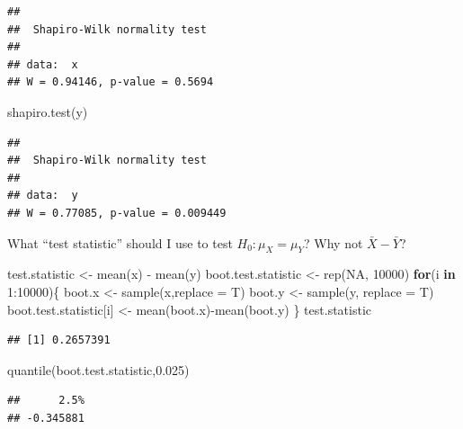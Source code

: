 \documentclass[
]{book}
\newenvironment{Shaded}{\begin{snugshade}}{\end{snugshade}}
\newcommand{\AttributeTok}[1]{\textcolor[rgb]{0.77,0.63,0.00}{#1}}
\newcommand{\ConstantTok}[1]{\textcolor[rgb]{0.00,0.00,0.00}{#1}}
\newcommand{\ControlFlowTok}[1]{\textcolor[rgb]{0.13,0.29,0.53}{\textbf{#1}}}
\newcommand{\DecValTok}[1]{\textcolor[rgb]{0.00,0.00,0.81}{#1}}
\newcommand{\FloatTok}[1]{\textcolor[rgb]{0.00,0.00,0.81}{#1}}
\newcommand{\FunctionTok}[1]{\textcolor[rgb]{0.00,0.00,0.00}{#1}}
\newcommand{\NormalTok}[1]{#1}
\newcommand{\OtherTok}[1]{\textcolor[rgb]{0.56,0.35,0.01}{#1}}
\newcommand{\SpecialCharTok}[1]{\textcolor[rgb]{0.00,0.00,0.00}{#1}}
\begin{document}
\begin{verbatim}
## 
##  Shapiro-Wilk normality test
## 
## data:  x
## W = 0.94146, p-value = 0.5694
\end{verbatim}

\begin{Shaded}
\begin{Highlighting}[]
\FunctionTok{shapiro.test}\NormalTok{(y)}
\end{Highlighting}
\end{Shaded}

\begin{verbatim}
## 
##  Shapiro-Wilk normality test
## 
## data:  y
## W = 0.77085, p-value = 0.009449
\end{verbatim}

What ``test statistic'' should I use to test \(H_0:\mu_X = \mu_Y\)? Why not \(\bar X - \bar Y\)?

\begin{Shaded}
\begin{Highlighting}[]
\NormalTok{test.statistic }\OtherTok{\textless{}{-}} \FunctionTok{mean}\NormalTok{(x) }\SpecialCharTok{{-}} \FunctionTok{mean}\NormalTok{(y)}
\NormalTok{boot.test.statistic }\OtherTok{\textless{}{-}} \FunctionTok{rep}\NormalTok{(}\ConstantTok{NA}\NormalTok{, }\DecValTok{10000}\NormalTok{)}
\ControlFlowTok{for}\NormalTok{(i }\ControlFlowTok{in} \DecValTok{1}\SpecialCharTok{:}\DecValTok{10000}\NormalTok{)\{}
\NormalTok{  boot.x }\OtherTok{\textless{}{-}} \FunctionTok{sample}\NormalTok{(x,}\AttributeTok{replace =}\NormalTok{ T)}
\NormalTok{  boot.y }\OtherTok{\textless{}{-}} \FunctionTok{sample}\NormalTok{(y, }\AttributeTok{replace =}\NormalTok{ T)}
\NormalTok{  boot.test.statistic[i] }\OtherTok{\textless{}{-}} \FunctionTok{mean}\NormalTok{(boot.x)}\SpecialCharTok{{-}}\FunctionTok{mean}\NormalTok{(boot.y)}
\NormalTok{\}}
\NormalTok{test.statistic}
\end{Highlighting}
\end{Shaded}

\begin{verbatim}
## [1] 0.2657391
\end{verbatim}

\begin{Shaded}
\begin{Highlighting}[]
\FunctionTok{quantile}\NormalTok{(boot.test.statistic,}\FloatTok{0.025}\NormalTok{)}
\end{Highlighting}
\end{Shaded}

\begin{verbatim}
##      2.5% 
## -0.345881
\end{verbatim}
\end{document}
